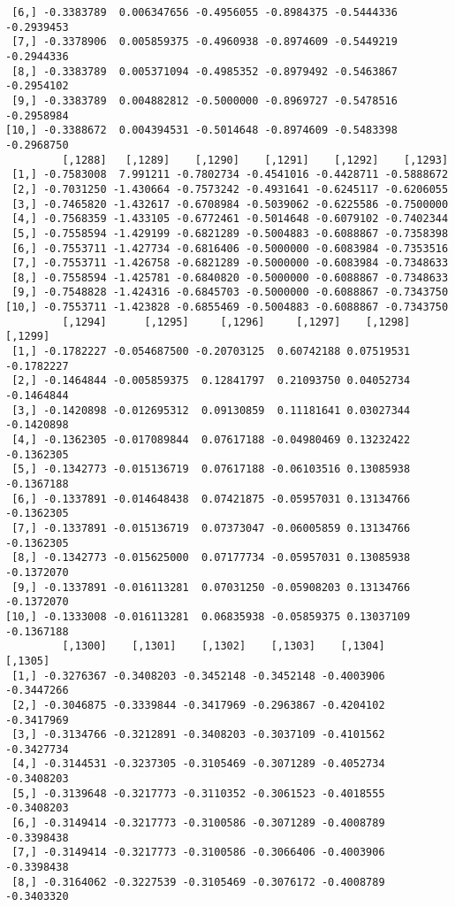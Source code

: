 \documentclass[
  letterpaper,
  DIV=11,
  numbers=noendperiod]{scrreprt}
\begin{document}
\begin{verbatim}
 [6,] -0.3383789  0.006347656 -0.4956055 -0.8984375 -0.5444336 -0.2939453
 [7,] -0.3378906  0.005859375 -0.4960938 -0.8974609 -0.5449219 -0.2944336
 [8,] -0.3383789  0.005371094 -0.4985352 -0.8979492 -0.5463867 -0.2954102
 [9,] -0.3383789  0.004882812 -0.5000000 -0.8969727 -0.5478516 -0.2958984
[10,] -0.3388672  0.004394531 -0.5014648 -0.8974609 -0.5483398 -0.2968750
         [,1288]   [,1289]    [,1290]    [,1291]    [,1292]    [,1293]
 [1,] -0.7583008  7.991211 -0.7802734 -0.4541016 -0.4428711 -0.5888672
 [2,] -0.7031250 -1.430664 -0.7573242 -0.4931641 -0.6245117 -0.6206055
 [3,] -0.7465820 -1.432617 -0.6708984 -0.5039062 -0.6225586 -0.7500000
 [4,] -0.7568359 -1.433105 -0.6772461 -0.5014648 -0.6079102 -0.7402344
 [5,] -0.7558594 -1.429199 -0.6821289 -0.5004883 -0.6088867 -0.7358398
 [6,] -0.7553711 -1.427734 -0.6816406 -0.5000000 -0.6083984 -0.7353516
 [7,] -0.7553711 -1.426758 -0.6821289 -0.5000000 -0.6083984 -0.7348633
 [8,] -0.7558594 -1.425781 -0.6840820 -0.5000000 -0.6088867 -0.7348633
 [9,] -0.7548828 -1.424316 -0.6845703 -0.5000000 -0.6088867 -0.7343750
[10,] -0.7553711 -1.423828 -0.6855469 -0.5004883 -0.6088867 -0.7343750
         [,1294]      [,1295]     [,1296]     [,1297]    [,1298]    [,1299]
 [1,] -0.1782227 -0.054687500 -0.20703125  0.60742188 0.07519531 -0.1782227
 [2,] -0.1464844 -0.005859375  0.12841797  0.21093750 0.04052734 -0.1464844
 [3,] -0.1420898 -0.012695312  0.09130859  0.11181641 0.03027344 -0.1420898
 [4,] -0.1362305 -0.017089844  0.07617188 -0.04980469 0.13232422 -0.1362305
 [5,] -0.1342773 -0.015136719  0.07617188 -0.06103516 0.13085938 -0.1367188
 [6,] -0.1337891 -0.014648438  0.07421875 -0.05957031 0.13134766 -0.1362305
 [7,] -0.1337891 -0.015136719  0.07373047 -0.06005859 0.13134766 -0.1362305
 [8,] -0.1342773 -0.015625000  0.07177734 -0.05957031 0.13085938 -0.1372070
 [9,] -0.1337891 -0.016113281  0.07031250 -0.05908203 0.13134766 -0.1372070
[10,] -0.1333008 -0.016113281  0.06835938 -0.05859375 0.13037109 -0.1367188
         [,1300]    [,1301]    [,1302]    [,1303]    [,1304]    [,1305]
 [1,] -0.3276367 -0.3408203 -0.3452148 -0.3452148 -0.4003906 -0.3447266
 [2,] -0.3046875 -0.3339844 -0.3417969 -0.2963867 -0.4204102 -0.3417969
 [3,] -0.3134766 -0.3212891 -0.3408203 -0.3037109 -0.4101562 -0.3427734
 [4,] -0.3144531 -0.3237305 -0.3105469 -0.3071289 -0.4052734 -0.3408203
 [5,] -0.3139648 -0.3217773 -0.3110352 -0.3061523 -0.4018555 -0.3408203
 [6,] -0.3149414 -0.3217773 -0.3100586 -0.3071289 -0.4008789 -0.3398438
 [7,] -0.3149414 -0.3217773 -0.3100586 -0.3066406 -0.4003906 -0.3398438
 [8,] -0.3164062 -0.3227539 -0.3105469 -0.3076172 -0.4008789 -0.3403320

\end{verbatim}
\end{document}
